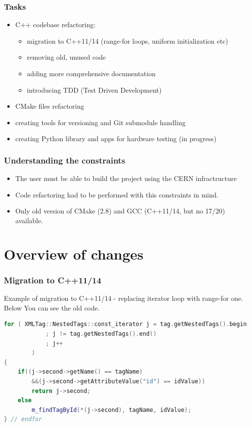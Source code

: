 \documentclass[10pt]{beamer}
\begin{document}
\begin{frame}
\frametitle{Tasks}
\begin{itemize}
    \item C++ codebase refactoring: \begin{itemize}
        \item migration to C++11/14 (range-for loops, uniform initialization etc)
        \item removing old, unused code 
        \item adding more comprehensive documentation
        \item introducing TDD (Test Driven Development)
    \end{itemize}
    \item CMake files refactoring
    \item creating tools for versioning and Git submodule handling
    \item creating Python library and apps for hardware testing (in progress)
\end{itemize}
\end{frame}

\begin{frame}
\frametitle{Understanding the constraints}
\begin{itemize}
\item The user must be able to build the project using the CERN infractructure
\item Code refactoring had to be performed with this constraints in mind.
\item Only old version of CMake (2.8) and GCC (C++11/14, but no 17/20) available.
\end{itemize}
\end{frame}


\section {Overview of changes}


\begin{frame}[fragile]
\frametitle{Migration to C++11/14}
Example of migration to C++11/14 - replacing iterator loop with range-for one. Below You can see the old code.
\begin{lstlisting}[language=c++, caption={Example of old C++ code (before refactoring).}]
for ( XMLTag::NestedTags::const_iterator j = tag.getNestedTags().begin()
            ; j != tag.getNestedTags().end()
            ; j++
        )
{
    if((j->second->getName() == tagName)
        &&(j->second->getAttributeValue("id") == idValue))
        return j->second;
    else
        m_findTagById(*(j->second), tagName, idValue);		
} // endfor
\end{lstlisting}
\end{frame}
\end{document}
